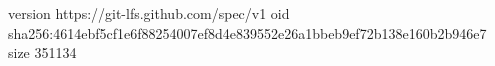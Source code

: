 version https://git-lfs.github.com/spec/v1
oid sha256:4614ebf5cf1e6f88254007ef8d4e839552e26a1bbeb9ef72b138e160b2b946e7
size 351134
